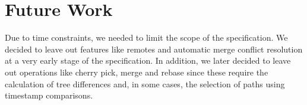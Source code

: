 \section{Future Work}

Due to time constraints, we needed to limit the scope of the specification. We
decided to leave out features like remotes and automatic merge conflict
resolution at a very early stage of the specification. In addition, we later
decided to leave out operations like cherry pick, merge and rebase since these
require the calculation of tree differences and, in some cases, the selection of
paths using timestamp comparisons.

